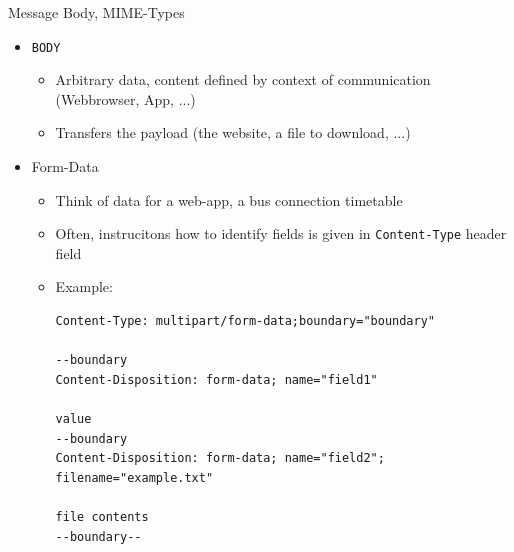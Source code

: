 \begin{frame}[fragile]{Message Body, MIME-Types}
%
\begin{itemize}
\item \texttt{BODY}
	\begin{itemize}
	\item Arbitrary data, content defined by context of communication (Webbrowser, App, ...)
	\item Transfers the payload (\zB the website, a file to download, ...)
	\end{itemize}
\pause
\item Form-Data
	\begin{itemize}
	\item Think of data for a web-app, \zB a bus connection timetable
	\item Often, instrucitons how to identify fields is given in \texttt{Content-Type} header field
\pause
	\item Example:
		\begin{verbatim}
Content-Type: multipart/form-data;boundary="boundary"

--boundary
Content-Disposition: form-data; name="field1"

value
--boundary
Content-Disposition: form-data; name="field2"; filename="example.txt"

file contents
--boundary--
		\end{verbatim}
	\end{itemize}
\end{itemize}
%
\end{frame}


